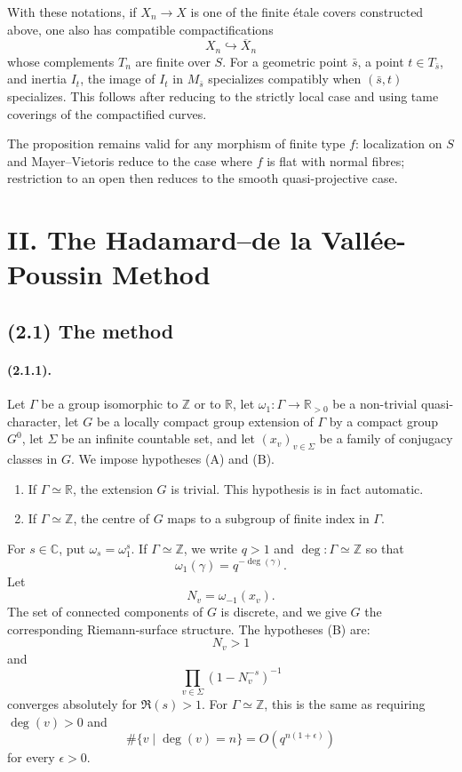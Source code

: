 \documentclass[11pt]{article}
\theoremstyle{remark}
\newcommand{\ZZ}{\mathbb{Z}}
\newcommand{\CC}{\mathbb{C}}
\newcommand{\RR}{\mathbb{R}}
\begin{document}
With these notations, if \(X_n\to X\) is one of the finite étale covers constructed above, one also has compatible compactifications
\[
X_n\hookrightarrow \overline X_n
\]
whose complements \(T_n\) are finite over \(S\). For a geometric point \(\bar s\), a point \(t\in T_{\bar s}\), and inertia \(I_t\), the image of \(I_t\) in \(M_{\bar s}\) specializes compatibly when \((\bar s,t)\) specializes. This follows after reducing to the strictly local case and using tame coverings of the compactified curves.

The proposition remains valid for any morphism of finite type \(f\): localization on \(S\) and Mayer--Vietoris reduce to the case where \(f\) is flat with normal fibres; restriction to an open then reduces to the smooth quasi-projective case.

\section*{II. The Hadamard--de la Vallée-Poussin Method}

\subsection*{(2.1) The method}

\paragraph{(2.1.1).}
Let \(\Gamma\) be a group isomorphic to \(\ZZ\) or to \(\RR\), let \(\omega_1:\Gamma\to\RR_{>0}\) be a non-trivial quasi-character, let \(G\) be a locally compact group extension of \(\Gamma\) by a compact group \(G^0\), let \(\Sigma\) be an infinite countable set, and let \((x_v)_{v\in\Sigma}\) be a family of conjugacy classes in \(G\). We impose hypotheses (A) and (B).

\begin{enumerate}[label=(A\arabic*)]
\item If \(\Gamma\simeq\RR\), the extension \(G\) is trivial. This hypothesis is in fact automatic.
\item If \(\Gamma\simeq\ZZ\), the centre of \(G\) maps to a subgroup of finite index in \(\Gamma\).
\end{enumerate}

For \(s\in\CC\), put \(\omega_s=\omega_1^s\). If \(\Gamma\simeq\ZZ\), we write \(q>1\) and \(\deg:\Gamma\simeq\ZZ\) so that
\[
\omega_1(\gamma)=q^{-\deg(\gamma)}.
\]
Let
\[
N_v=\omega_{-1}(x_v).
\]
The set of connected components of \(G\) is discrete, and we give \(G\) the corresponding Riemann-surface structure. The hypotheses (B) are:
\[
N_v>1
\]
and
\[
\prod_{v\in\Sigma}(1-N_v^{-s})^{-1}
\]
converges absolutely for \(\Re(s)>1\). For \(\Gamma\simeq\ZZ\), this is the same as requiring \(\deg(v)>0\) and
\[
\#\{v\mid \deg(v)=n\}=O(q^{n(1+\epsilon)})
\]
for every \(\epsilon>0\).
\end{document}
